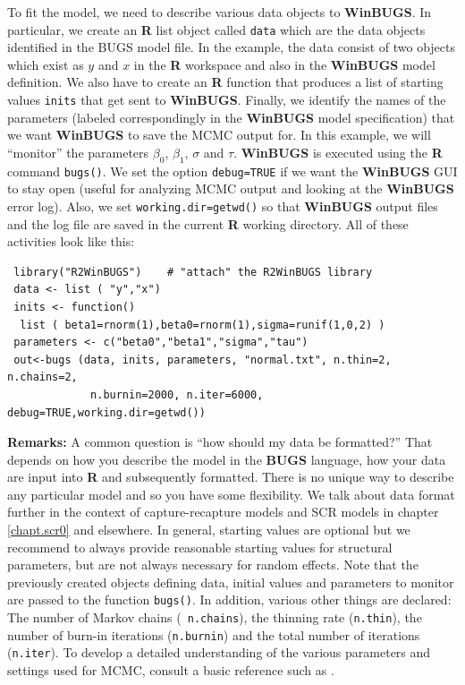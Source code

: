 To fit the model, we need to describe various data objects to {\bf
  WinBUGS}. In particular,
we create an {\bf R} list object called \mbox{\tt data} which
are the data objects identified in the BUGS model file.
 In the example, the
data consist of two objects which exist as $y$ and $x$ in the {\bf R}
workspace and also in the {\bf WinBUGS} model definition.
 We also have to create an {\bf R} function
that produces a list of starting values \mbox{\tt inits} that get sent to
{\bf WinBUGS}.
 Finally, we identify
the names of the parameters (labeled correspondingly in the {\bf WinBUGS}
model specification) that we want {\bf WinBUGS} to save the MCMC output
for. In this example, we will ``monitor'' the parameters
$\beta_0$, $\beta_1$, $\sigma$ and $\tau$.
{\bf WinBUGS} is executed using the {\bf R} command
\mbox{\tt bugs()}.
We set the option \mbox{\tt debug=TRUE} if we want the {\bf WinBUGS}
GUI to stay open (useful for analyzing MCMC output and looking at the
{\bf WinBUGS} error log). Also, we set \mbox{\tt working.dir=getwd()}
so that {\bf WinBUGS} output files and the log file are saved in the
current {\bf R} working directory.
  All of these activities look like this:
{\small
\begin{verbatim}
 library("R2WinBUGS")    # "attach" the R2WinBUGS library
 data <- list ( "y","x")
 inits <- function()
  list ( beta1=rnorm(1),beta0=rnorm(1),sigma=runif(1,0,2) )
 parameters <- c("beta0","beta1","sigma","tau")
 out<-bugs (data, inits, parameters, "normal.txt", n.thin=2, n.chains=2,
             n.burnin=2000, n.iter=6000, debug=TRUE,working.dir=getwd())
\end{verbatim}
}

{\bf Remarks:} A common question is ``how should my data be
formatted?'' That depends on how you describe the model in the {\bf
  BUGS} language, how your data are input into {\bf R} and
subsequently formatted.  There is no unique way to describe any
particular model and so you have some flexibility. We talk about data
format further in the context of capture-recapture models and SCR
models in chapter \ref{chapt.scr0} and elsewhere.  In general,
starting values are optional but we recommend to always provide
reasonable starting values for structural parameters, but are not
always necessary for random effects.  Note that the previously created
objects defining data, initial values and parameters to monitor are
passed to the function \mbox{\tt bugs()}.  In addition, various other
things are declared: The number of Markov chains (\mbox{\tt
  n.chains}), the thinning rate (\mbox{\tt n.thin}),
the number of burn-in iterations (\mbox{\tt n.burnin}) and the total
number of iterations
(\mbox{\tt n.iter}).
To develop a detailed understanding of the various parameters and
settings used for MCMC, consult a basic reference such as
\citet{kery:2010}.



